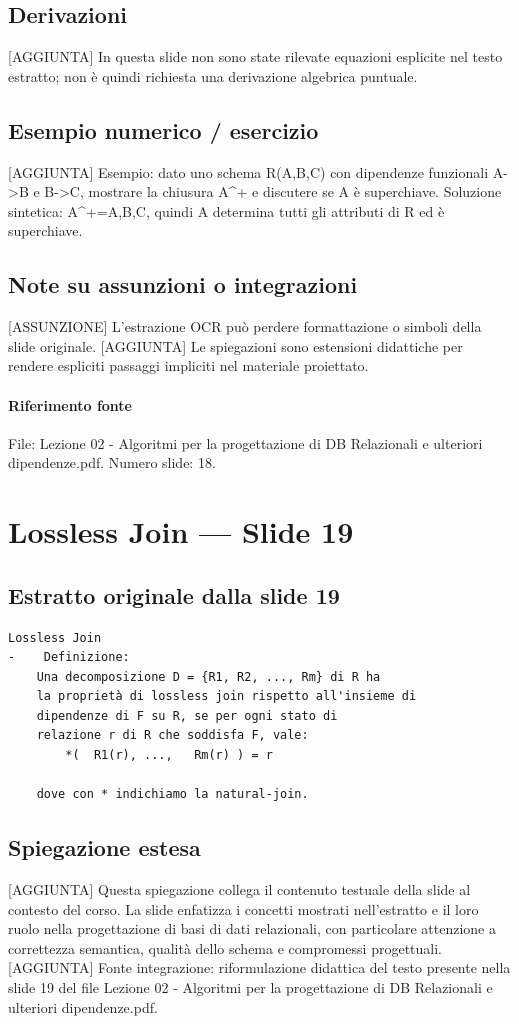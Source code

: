 \documentclass[11pt]{article}
\begin{document}
\subsection*{Derivazioni}
[AGGIUNTA] In questa slide non sono state rilevate equazioni esplicite nel testo estratto; non è quindi richiesta una derivazione algebrica puntuale.
\subsection*{Esempio numerico / esercizio}
[AGGIUNTA] Esempio: dato uno schema R(A,B,C) con dipendenze funzionali A->B e B->C, mostrare la chiusura A^+ e discutere se A è superchiave. Soluzione sintetica: A^+={A,B,C}, quindi A determina tutti gli attributi di R ed è superchiave.
\subsection*{Note su assunzioni o integrazioni}
[ASSUNZIONE] L'estrazione OCR può perdere formattazione o simboli della slide originale.
[AGGIUNTA] Le spiegazioni sono estensioni didattiche per rendere espliciti passaggi impliciti nel materiale proiettato.
\paragraph{Riferimento fonte} File: Lezione 02 - Algoritmi per la progettazione di DB Relazionali e ulteriori dipendenze.pdf. Numero slide: 18.
\section{Lossless Join --- Slide 19}
\subsection*{Estratto originale dalla slide 19}
\begin{lstlisting}
Lossless Join
-    Definizione:
    Una decomposizione D = {R1, R2, ..., Rm} di R ha
    la proprietà di lossless join rispetto all'insieme di
    dipendenze di F su R, se per ogni stato di
    relazione r di R che soddisfa F, vale:
        *(  R1(r), ...,   Rm(r) ) = r

    dove con * indichiamo la natural-join.
\end{lstlisting}
\subsection*{Spiegazione estesa}
[AGGIUNTA] Questa spiegazione collega il contenuto testuale della slide al contesto del corso. La slide enfatizza i concetti mostrati nell'estratto e il loro ruolo nella progettazione di basi di dati relazionali, con particolare attenzione a correttezza semantica, qualità dello schema e compromessi progettuali.
[AGGIUNTA] Fonte integrazione: riformulazione didattica del testo presente nella slide 19 del file Lezione 02 - Algoritmi per la progettazione di DB Relazionali e ulteriori dipendenze.pdf.
\end{document}
